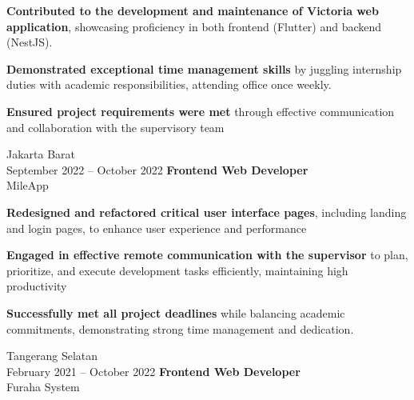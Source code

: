 \documentclass[../main.tex]{subfiles}
\begin{document}
        \vspace{0.10 cm}
        \begin{onecolentry}
            \begin{highlights}
            \item \textbf{Contributed to the development and maintenance of Victoria web application}, showcasing proficiency in both frontend (Flutter) and backend (NestJS).
            \item \textbf{Demonstrated exceptional time management skills} by juggling internship duties with academic responsibilities, attending office once weekly.
            \item \textbf{Ensured project requirements were met} through effective communication and collaboration with the supervisory team
            \end{highlights}
        \end{onecolentry}


        \vspace{0.2 cm}

        \begin{twocolentry}{
            Jakarta Barat\\
            September 2022 – October 2022}
            \textbf{Frontend Web Developer}\\
            MileApp
        \end{twocolentry}

        \vspace{0.10 cm}
        \begin{onecolentry}
            \begin{highlights}
            \item \textbf{Redesigned and refactored critical user interface pages}, including landing and login pages, to enhance user experience and performance
            \item \textbf{Engaged in effective remote communication with the supervisor} to plan, prioritize, and execute development tasks efficiently, maintaining high productivity
            \item \textbf{Successfully met all project deadlines} while balancing academic commitments, demonstrating strong time management and dedication.
            \end{highlights}
        \end{onecolentry}

        \vspace{0.2 cm}

        \begin{twocolentry}{
            Tangerang Selatan\\
            February 2021 – October 2022}
            \textbf{Frontend Web Developer}\\
            Furaha System
        \end{twocolentry}
\end{document}
